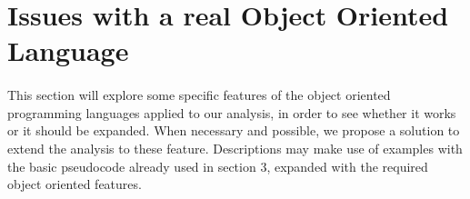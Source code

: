 \documentclass[letterpaper,twocolumn,10pt]{article}
\begin{document}

\section{Issues with a real Object Oriented Language}
\paragraph{}
This section will explore some specific features of the object oriented programming languages applied to our analysis, in order to see whether it works or it should be expanded. When necessary and possible, we propose a solution to extend the analysis to these feature. Descriptions may make use of examples with the basic pseudocode already used in section 3, expanded with the required object oriented features.
\end{document}

